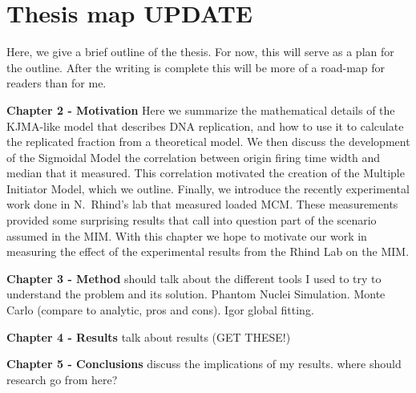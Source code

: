 		
	\section{Thesis map \textbf{UPDATE}}
	\label{sec:Map}

	Here, we give a brief outline of the thesis. For now, this will serve as a plan for the outline. After the writing is complete this will be more of a road-map for readers than for me.
	
	\textbf{Chapter 2 - Motivation}
	Here we summarize the mathematical details of the KJMA-like model that describes DNA replication, and how to use it to calculate the replicated fraction from a theoretical model.
	We then discuss the development of the Sigmoidal Model the correlation between origin firing time width and median that it measured.
	This correlation motivated the creation of the Multiple Initiator Model, which we outline.
	Finally, we introduce the recently experimental work done in N.~Rhind's lab that measured loaded MCM.
	These measurements provided some surprising results that call into question part of the scenario assumed in the MIM.
	With this chapter we hope to motivate our work in measuring the effect of the experimental results from the Rhind Lab on the MIM.
	
	\textbf{Chapter 3 - Method}
	should talk about the different tools I used to try to understand the problem and its solution.
	Phantom Nuclei Simulation.
	Monte Carlo (compare to analytic, pros and cons).
	Igor global fitting.
	
	\textbf{Chapter 4 - Results}
	talk about results (GET THESE!)
	
	\textbf{Chapter 5 - Conclusions}
	discuss the implications of my results.
	where should research go from here?
		
		
		
		
		
		
		
		
		
		